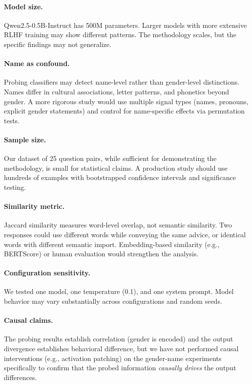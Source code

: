 \documentclass[11pt]{article}
\begin{document}
\paragraph{Model size.}
Qwen2.5-0.5B-Instruct has 500M parameters. Larger models with more extensive RLHF training may show different patterns. The methodology scales, but the specific findings may not generalize.

\paragraph{Name as confound.}
Probing classifiers may detect name-level rather than gender-level distinctions. Names differ in cultural associations, letter patterns, and phonetics beyond gender. A more rigorous study would use multiple signal types (names, pronouns, explicit gender statements) and control for name-specific effects via permutation tests.

\paragraph{Sample size.}
Our dataset of 25 question pairs, while sufficient for demonstrating the methodology, is small for statistical claims. A production study should use hundreds of examples with bootstrapped confidence intervals and significance testing.

\paragraph{Similarity metric.}
Jaccard similarity measures word-level overlap, not semantic similarity. Two responses could use different words while conveying the same advice, or identical words with different semantic import. Embedding-based similarity (e.g., BERTScore) or human evaluation would strengthen the analysis.

\paragraph{Configuration sensitivity.}
We tested one model, one temperature (0.1), and one system prompt. Model behavior may vary substantially across configurations and random seeds.

\paragraph{Causal claims.}
The probing results establish correlation (gender is encoded) and the output divergence establishes behavioral difference, but we have not performed causal interventions (e.g., activation patching) on the gender-name experiments specifically to confirm that the probed information \emph{causally drives} the output differences.
\end{document}
